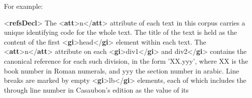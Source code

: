 For example: \par\bgroup{}\exampleFont \begin{shaded}\noindent\mbox{}{<\textbf{refsDecl}>}\mbox{}\newline 
{}The {<\textbf{att}>}n{</\textbf{att}>} attribute of each text in this corpus carries a\mbox{}\newline 
\hspace*{1em}\hspace*{1em} unique identifying code for the whole text. The title of the text is\mbox{}\newline 
\hspace*{1em}\hspace*{1em} held as the content of the first {<\textbf{gi}>}head{</\textbf{gi}>} element within each\mbox{}\newline 
\hspace*{1em}\hspace*{1em} text. The {<\textbf{att}>}n{</\textbf{att}>} attribute on each {<\textbf{gi}>}div1{</\textbf{gi}>} and\mbox{}\newline 
{}div2{</\textbf{gi}>} contains the canonical reference for each such\mbox{}\newline 
\hspace*{1em}\hspace*{1em} division, in the form 'XX.yyy', where XX is the book number in Roman\mbox{}\newline 
\hspace*{1em}\hspace*{1em} numerals, and yyy the section number in arabic. Line breaks are\mbox{}\newline 
\hspace*{1em}\hspace*{1em} marked by empty {<\textbf{gi}>}lb{</\textbf{gi}>} elements, each of which includes the\mbox{}\newline 
\hspace*{1em}\hspace*{1em} through line number in Casaubon's edition as the value of its\mbox{}\newline 

\end{shaded}
